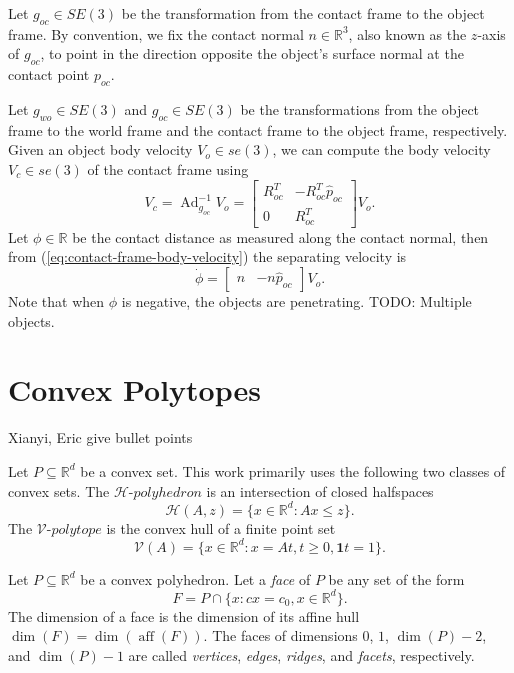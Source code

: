 \documentclass[conference]{IEEEtran}
\DeclareMathOperator{\adjoint}{Ad}
\DeclareMathOperator{\aff}{aff}
\newcommand{\TODO}[1]{{\color{red} {{#1}}}}
\begin{document}
Let $g_{oc} \in SE(3)$ be the transformation from the contact frame to the
object frame. By convention, we fix the contact normal $n \in \mathbb{R}^3$,
also known as the $z$-axis of $g_{oc}$, to point in the direction opposite the
object's surface normal at the contact point $p_{oc}$. 

Let $g_{wo} \in SE(3)$ and $g_{oc} \in SE(3)$ be the transformations from the
object frame to the world frame and the contact frame to the object frame,
respectively. Given an object body velocity $V_o \in se(3)$, we can compute the
body velocity $V_c \in se(3)$ of the contact frame using 
\begin{equation}
    V_c = \adjoint_{g_{oc}}^{-1}V_o = 
    \begin{bmatrix}
        R_{oc}^T & -R_{oc}^T\hat{p}_{oc}\\
        0 & R_{oc}^T
    \end{bmatrix}V_o. \label{eq:contact-frame-body-velocity}
\end{equation}
Let $\phi \in \mathbb{R}$ be the contact distance as measured along the
contact normal, then from (\ref{eq:contact-frame-body-velocity}) the separating
velocity is 
\begin{equation}
\dot{\phi} = \begin{bmatrix} n & -n\hat{p}_{oc} \end{bmatrix}V_o.
\end{equation}
Note that when $\phi$ is negative, the objects are penetrating. \TODO{TODO:
Multiple objects.}

\section{Convex Polytopes}

\TODO{Xianyi, Eric give bullet points}

Let $P \subseteq \mathbb{R}^d$ be a convex set. This work primarily uses the
following two classes of convex sets. The $\mathcal{H}\text{-}polyhedron$ is an
intersection of closed halfspaces
\begin{equation}
    \mathcal{H}(A,z) = \{x \in \mathbb{R}^d : Ax \leq z\}.
\end{equation}
The $\mathcal{V}\text{-}polytope$ is the convex hull of a finite point set
\begin{equation}
    \mathcal{V}(A) = \{x \in \mathbb{R}^d : x = At, t \geq 0, \mathbf{1}t = 1\}.
\end{equation}

Let $P \subseteq \mathbb{R}^d$ be a convex polyhedron. Let a \textit{face} of
$P$ be any set of the form 
\begin{equation}
    F = P \cap \{x : cx = c_0, x \in \mathbb{R}^d\}.
\end{equation}
The dimension of a face is the dimension of its affine hull $\dim(F) =
\dim(\aff(F))$. The faces of dimensions $0$, $1$, $\dim(P)-2$, and $\dim(P)-1$
are called \textit{vertices}, \textit{edges}, \textit{ridges}, and
\textit{facets}, respectively.
\end{document}
